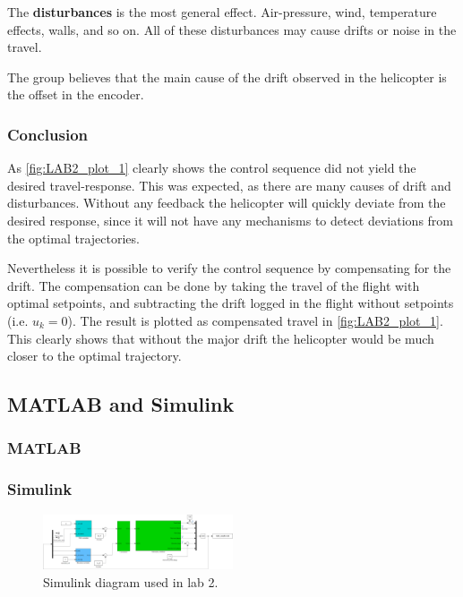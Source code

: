 \documentclass[../main.tex]{subfiles}
\begin{document}
The \textbf{disturbances} is the most general effect. Air-pressure, wind, temperature effects, walls, and so on. All of these disturbances may cause drifts or noise in the travel. 

The group believes that the main cause of the drift observed in the helicopter is the offset in the encoder.

\subsubsection{Conclusion}
As \cref{fig:LAB2_plot_1} clearly shows the control sequence did not yield the desired travel-response. This was expected, as there are many causes of drift and disturbances. Without any feedback the helicopter will quickly deviate from the desired response, since it will not have any mechanisms to detect deviations from the optimal trajectories.

Nevertheless it is possible to verify the control sequence by compensating for the drift. The compensation can be done by taking the travel of the flight with optimal setpoints, and subtracting the drift logged in the flight without setpoints (i.e. $ u_k = 0 $). The result is plotted as compensated travel in \cref{fig:LAB2_plot_1}. This clearly shows that without the major drift the helicopter would be much closer to the optimal trajectory.


\clearpage
\subsection{MATLAB and Simulink}
\subsubsection{MATLAB}

\clearpage
\subsubsection{Simulink}
\begin{figure}[h]
	\centering
	\includegraphics[angle=90, width=0.5\textwidth,height=0.7\textheight]{code/lab2_simulink}
	\caption{Simulink diagram used in lab 2.}
	\label{fig:lab2_simulink}
\end{figure}
\end{document}
